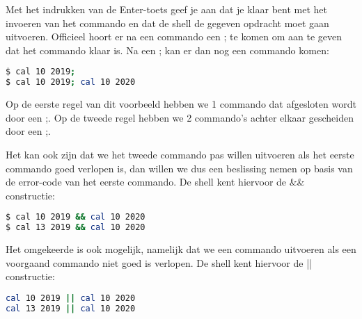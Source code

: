 Met het indrukken van de Enter-toets geef je aan dat je klaar bent met het invoeren van het commando en dat de shell de gegeven opdracht moet gaan uitvoeren. Officieel hoort er na een commando een ; te komen om aan te geven dat het commando klaar is. Na een ; kan er dan nog een commando komen:
\begin{lstlisting}[language=bash]
$ cal 10 2019;
$ cal 10 2019; cal 10 2020
\end{lstlisting}
Op de eerste regel van dit voorbeeld hebben we 1 commando dat afgesloten wordt door een ;. Op de tweede regel hebben we 2 commando's achter elkaar gescheiden door een ;.

Het kan ook zijn dat we het tweede commando pas willen uitvoeren als het eerste commando goed verlopen is, dan willen we dus een beslissing nemen op basis van de error-code van het eerste commando. De shell kent hiervoor de \&\&\index{\&\&} constructie:
\begin{lstlisting}[language=bash]
$ cal 10 2019 && cal 10 2020
$ cal 13 2019 && cal 10 2020
\end{lstlisting}

Het omgekeerde is ook mogelijk, namelijk dat we een commando uitvoeren als een voorgaand commando niet goed is verlopen. De shell kent hiervoor de ||\index{||} constructie:
\begin{lstlisting}[language=bash]
cal 10 2019 || cal 10 2020
cal 13 2019 || cal 10 2020
\end{lstlisting}

